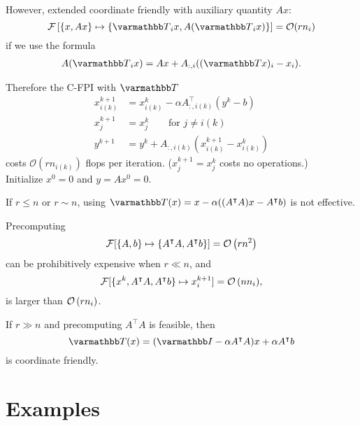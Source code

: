 \documentclass[10pt,mathserif]{beamer}
\begin{document}
\begin{frame}[plain]

However, extended coordinate friendly with auxiliary quantity $Ax$:
\[
\mathcal{F}\left[
\{x,Ax\}\mapsto\{\opT _ix,A(\opT _ix)\}
\right]=\mathcal{O}(rn_i)
\]
if we use the formula
\begin{gather*}
A(\opT_ix)
=Ax+A_{:,i}((\opT x)_i-x_i).
\end{gather*}
\medskip\pause

Therefore the C-FPI with $\opT$
\begin{align*}
x^{k+1}_{i(k)}&=x_{i(k)}^k-\alpha A^\intercal_{:,i(k)}(y^k-b)\\
x^{k+1}_{j}&=x_{j}^k\qquad\text{for } j\neq i(k)\\
y^{k+1}&=y^k+A_{:,i(k)}(x^{k+1}_{i(k)}-x_{i(k)}^k)
\end{align*}
costs $\mathcal{O}(rn_{i(k)})$ flops per iteration.
($x^{k+1}_{j}=x_{j}^k$ costs no operations.)\\
Initialize $x^0=0$ and $y=Ax^0=0$.
\end{frame}

\begin{frame}
If $r \le n$ or $r \sim n$, %
using $\opT(x)=x-\alpha ((A^\intercal A)x-A^\intercal b)$ is not effective.

\medskip
Precomputing
\[
{\mathcal{F}}[\{A,b\}\mapsto \{A^\intercal A,A^\intercal b\}]={\mathcal{O}\left(rn^2\right)}
\]
can be prohibitively expensive when $r \ll n$, and
\[
{\mathcal{F}}[\{x^k,A^\intercal A,A^\intercal b\}\mapsto x^{k+1}_{i}]={\mathcal{O}\left(nn_{i}\right)},
\]
is larger than ${\mathcal{O}\left(rn_{i}\right)}$.

\medskip\pause
If $r \gg n$ and precomputing $A^\intercal A$ is feasible, then 
\[
\opT(x) = (\opI - \alpha A^\intercal A)x +\alpha A^\intercal b
\]
is coordinate friendly.
\end{frame}

\section{Examples}
\end{document}
